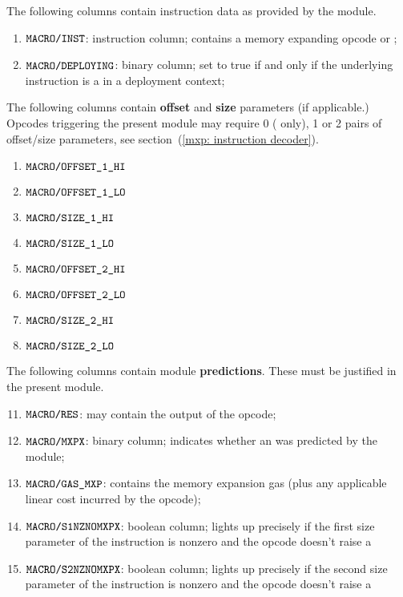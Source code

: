 The following columns contain instruction data as provided by the \hubMod{} module.
\begin{enumerate}
	\item
		\godGiven{}
		$\texttt{MACRO}\texttt{/}{\texttt{INST}}$:
		instruction column;
		contains a memory expanding opcode or ;
	\item
		\godGiven{}
		$\texttt{MACRO}\texttt{/}{\texttt{DEPLOYING}}$:
		binary column;
		set to true if and only if the underlying instruction is a  in a deployment context;
\end{enumerate}
The following columns contain \textbf{offset} and \textbf{size} parameters (if applicable.)
Opcodes triggering the present module may require 0 ( only), 1 or 2 pairs of offset/size parameters,
see section~(\ref{mxp: instruction decoder}).
\begin{multicols}{2}
	\begin{enumerate}[resume]
		\item
			\godGiven{}
			$\texttt{MACRO}\texttt{/}{\texttt{OFFSET\_1\_HI}}$
		\item
			\godGiven{}
			$\texttt{MACRO}\texttt{/}{\texttt{OFFSET\_1\_LO}}$
		\item
			\godGiven{}
			$\texttt{MACRO}\texttt{/}{\texttt{SIZE\_1\_HI}}$
		\item
			\godGiven{}
			$\texttt{MACRO}\texttt{/}{\texttt{SIZE\_1\_LO}}$
		\item
			\godGiven{}
			$\texttt{MACRO}\texttt{/}{\texttt{OFFSET\_2\_HI}}$
		\item
			\godGiven{}
			$\texttt{MACRO}\texttt{/}{\texttt{OFFSET\_2\_LO}}$
		\item
			\godGiven{}
			$\texttt{MACRO}\texttt{/}{\texttt{SIZE\_2\_HI}}$
		\item
			\godGiven{}
			$\texttt{MACRO}\texttt{/}{\texttt{SIZE\_2\_LO}}$
	\end{enumerate}
\end{multicols}
The following columns contain \hubMod{} module \textbf{predictions}.
These must be justified in the present module.
\begin{enumerate}[resume] \setcounter{enumi}{10}
	\item
		\godGiven{}
		\markAsJustifiedHere{}
		$\texttt{MACRO}\texttt{/}{\texttt{RES}}$:
		may contain the output of the  opcode;
	\item
		\godGiven{}
		\markAsJustifiedHere{}
		$\texttt{MACRO}\texttt{/}{\texttt{MXPX}}$:
		binary column;
		indicates whether an \mxpxSH{} was predicted by the \hubMod{} module;
	\item
		\godGiven{}
		\markAsJustifiedHere{}
		$\texttt{MACRO}\texttt{/}{\texttt{GAS\_MXP}}$:
		contains the memory expansion gas (plus any applicable linear cost incurred by the opcode);
	\item
		\godGiven{}
		\markAsJustifiedHere{}
		$\texttt{MACRO}\texttt{/}{\texttt{S1NZNOMXPX}}$:
		boolean column;
		lights up precisely if the first size parameter of the instruction is nonzero and the opcode doesn't raise a \mxpxSH{}
	\item
		\godGiven{}
		\markAsJustifiedHere{}
		$\texttt{MACRO}\texttt{/}{\texttt{S2NZNOMXPX}}$:
		boolean column;
		lights up precisely if the second size parameter of the instruction is nonzero and the opcode doesn't raise a \mxpxSH{}
\end{enumerate}
